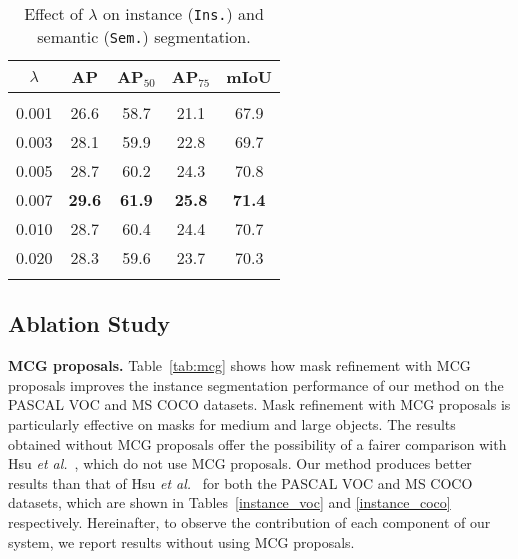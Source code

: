 \documentclass[final]{cvpr}
\begin{document}
\begin{table*}[t]
\begin{minipage}{0.32\linewidth}
{\begin{tabular}{c@{\hskip 0.17in}c@{\hskip 0.13in}c@{\hskip 0.1in}c@{\hskip 0.1in}c}
    $\lambda$ & AP    & AP$_{50}$  & AP$_{75}$  & mIoU \\
    \hline\hline
    \\[-0.9em]
         0.001   &  26.6    &  58.7    &    21.1  &  67.9 \\
     0.003  &   28.1   &    59.9  & 22.8    &  69.7\\
     0.005    &   28.7   &   60.2    &   24.3    &  70.8 \\
     0.007   &  \textbf{29.6}     &      \textbf{61.9} &  \textbf{25.8}     &  \textbf{71.4}\\
     0.010   &  28.7    & 60.4     &     24.4  &  70.7 \\ 
     0.020   &   28.3   &    59.6  &     23.7  & 70.3 \\

    \Xhline{1pt}
    \end{tabular}}
    \vspace{-0.7em}
      \caption{Effect of $\lambda$ on instance (\texttt{Ins.}) and semantic (\texttt{Sem.}) segmentation.}\label{table_lambda}\end{minipage}
\vspace{-1.2em}
\end{table*} 
\vspace{-0.1em}
\subsection{Ablation Study}
\vspace{-0.1em}

\textbf{MCG proposals.}
Table~\ref{tab:mcg} shows how mask refinement with MCG proposals improves the instance segmentation performance of our method on the PASCAL VOC and MS COCO datasets.
Mask refinement with MCG proposals is particularly effective on masks for medium and large objects. 
The results obtained without MCG proposals offer the possibility of a fairer comparison with Hsu \textit{et al.}~\cite{hsu2019weakly}, which do not use MCG proposals. Our method produces better results than that of Hsu \textit{et al.}~\cite{hsu2019weakly} for both the PASCAL VOC and MS COCO datasets, which are shown in Tables~\ref{instance_voc} and \ref{instance_coco} respectively.
Hereinafter, to observe the contribution of each component of our system, we report results without using MCG proposals.
\end{document}
